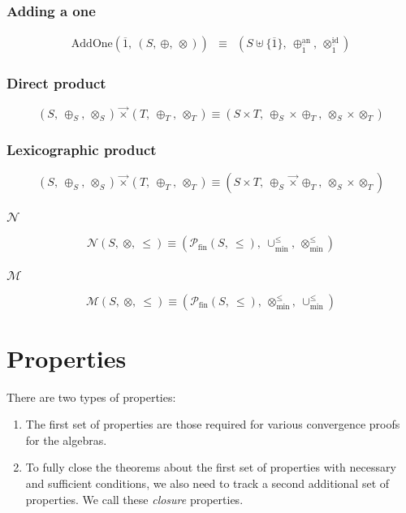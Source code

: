 \documentclass[10pt]{report}
\newcommand{\lexprod}{\ensuremath{\mathbin{\vec{\times}}}}
\newcommand{\minunion}{\mathbin{\cup_{\min}^{\leq}}}
\newcommand{\minlift}{\mathbin{\otimes_{\min}^{\leq}}}
\begin{document}
\subsection{Adding a one} 

\[ 
\begin{array}{rcl} 
\mathrm{AddOne}(\overline{1},\ (S,\ \oplus,\ \otimes)) 
   & \equiv 
   & (S \uplus \{\overline{1}\},\  \oplus_{\overline{1}}^{\mathrm{an}},\ \otimes_{\overline{1}}^{\mathrm{id}})
\end{array} 
\] 

\subsection{Direct product} 

\[
(S,\ \oplus_S,\ \otimes_S) \lexprod (T,\ \oplus_T,\ \otimes_T) 
\equiv
(S\times T,\ \oplus_S\times\oplus_T,\ \otimes_S\times\otimes_T)
\]


\subsection{Lexicographic product} 

\[
(S,\ \oplus_S,\ \otimes_S) \lexprod (T,\ \oplus_T,\ \otimes_T) 
\equiv
(S\times T,\ \oplus_S\lexprod\oplus_T,\ \otimes_S\times\otimes_T)
\]


\subsection{$\mathcal{N}$}
\[
\mathcal{N}(S,\ \otimes,\ \leq) \equiv (\mathcal{P}_{\mathrm{fin}}(S,\ \leq),\ \minunion,\ \minlift)
\]


\subsection{$\mathcal{M}$}

\[
\mathcal{M}(S,\ \otimes,\ \leq) \equiv (\mathcal{P}_{\mathrm{fin}}(S,\ \leq),\ \minlift,\ \minunion)
\]







\chapter{Properties} 

There are two types of properties:
\begin{enumerate}
\item The first set of properties are those required for various convergence proofs for the algebras.
\item  To fully close the theorems about the first set of properties with necessary and sufficient conditions, we also need to track a second additional set of properties.  We call these \emph{closure} properties.
\end{enumerate}
\end{document}
